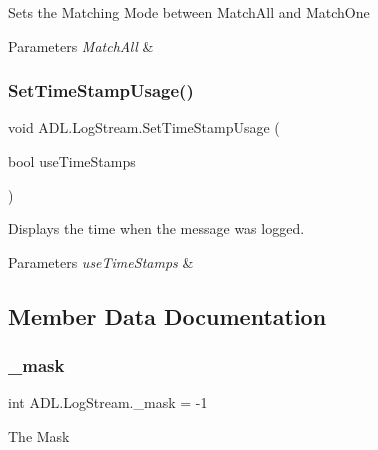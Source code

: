 Sets the Matching Mode between Match\+All and Match\+One 


\begin{DoxyParams}{Parameters}
{\em Match\+All} & \\
\hline
\end{DoxyParams}
\mbox{\label{class_a_d_l_1_1_log_stream_a533f3bae752ab3ee1c3f1aaac23a7d05}} 
\subsubsection{\texorpdfstring{Set\+Time\+Stamp\+Usage()}{SetTimeStampUsage()}}
{\footnotesize\ttfamily void A\+D\+L.\+Log\+Stream.\+Set\+Time\+Stamp\+Usage (\begin{DoxyParamCaption}\item[{bool}]{use\+Time\+Stamps }\end{DoxyParamCaption})}



Displays the time when the message was logged. 


\begin{DoxyParams}{Parameters}
{\em use\+Time\+Stamps} & \\
\hline
\end{DoxyParams}


\subsection{Member Data Documentation}
\mbox{\label{class_a_d_l_1_1_log_stream_a3d8bed5f5dbdebc350a831ea9eca999d}} 
\subsubsection{\texorpdfstring{\+\_\+mask}{\_mask}}
{\footnotesize\ttfamily int A\+D\+L.\+Log\+Stream.\+\_\+mask = -\/1\hspace{0.3cm}{\ttfamily [private]}}



The Mask 

